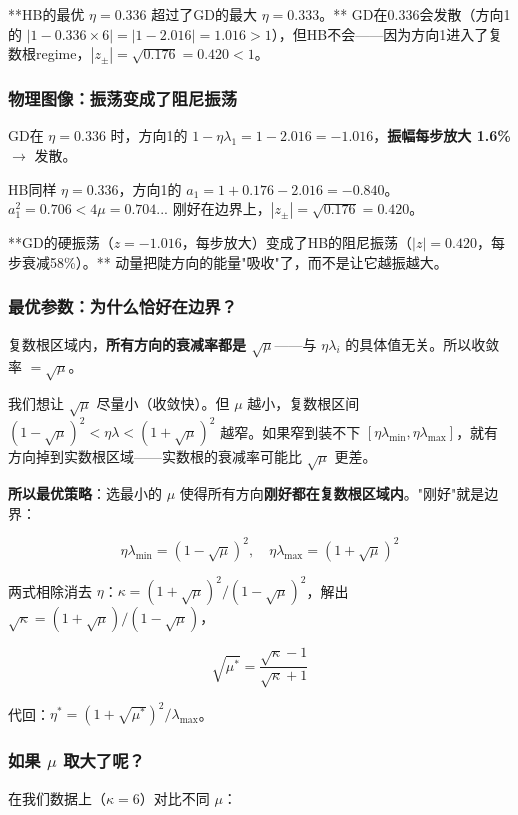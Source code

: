 \documentclass[12pt,a4paper]{article}
\begin{document}
**HB的最优 $\eta = 0.336$ 超过了GD的最大 $\eta = 0.333$。** GD在0.336会发散（方向1的 $|1-0.336\times6| = |1-2.016| = 1.016 > 1$），但HB不会——因为方向1进入了复数根regime，$|z_\pm| = \sqrt{0.176} = 0.420 < 1$。


\subsubsection{物理图像：振荡变成了阻尼振荡}

GD在 $\eta = 0.336$ 时，方向1的 $1-\eta\lambda_1 = 1-2.016 = -1.016$，\textbf{振幅每步放大 1.6\%} $\to$ 发散。

HB同样 $\eta = 0.336$，方向1的 $a_1 = 1+0.176-2.016 = -0.840$。$a_1^2 = 0.706 < 4\mu = 0.704$... 刚好在边界上，$|z_\pm| = \sqrt{0.176} = 0.420$。

**GD的硬振荡（$z = -1.016$，每步放大）变成了HB的阻尼振荡（$|z| = 0.420$，每步衰减58\%）。** 动量把陡方向的能量"吸收"了，而不是让它越振越大。


\subsubsection{最优参数：为什么恰好在边界？}

复数根区域内，\textbf{所有方向的衰减率都是 $\sqrt\mu$}——与 $\eta\lambda_i$ 的具体值无关。所以收敛率 $= \sqrt\mu$。

我们想让 $\sqrt\mu$ 尽量小（收敛快）。但 $\mu$ 越小，复数根区间 $(1-\sqrt\mu)^2 < \eta\lambda < (1+\sqrt\mu)^2$ 越窄。如果窄到装不下 $[\eta\lambda_{\min}, \eta\lambda_{\max}]$，就有方向掉到实数根区域——实数根的衰减率可能比 $\sqrt\mu$ 更差。

\textbf{所以最优策略}：选最小的 $\mu$ 使得所有方向\textbf{刚好都在复数根区域内}。"刚好"就是边界：

\[\eta\lambda_{\min} = (1-\sqrt\mu)^2, \quad \eta\lambda_{\max} = (1+\sqrt\mu)^2\]

两式相除消去 $\eta$：$\kappa = (1+\sqrt\mu)^2/(1-\sqrt\mu)^2$，解出 $\sqrt\kappa = (1+\sqrt\mu)/(1-\sqrt\mu)$，

\[\boxed{\sqrt{\mu^*} = \frac{\sqrt\kappa - 1}{\sqrt\kappa + 1}}\]

代回：$\eta^* = (1+\sqrt{\mu^*})^2/\lambda_{\max}$。

\subsubsection{如果 $\mu$ 取大了呢？}

在我们数据上（$\kappa = 6$）对比不同 $\mu$：
\end{document}
